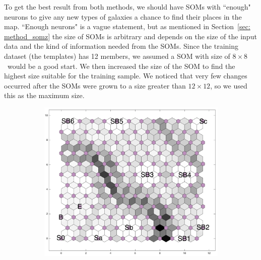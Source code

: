         To get the best result from both methods, we should have SOMs with ``enough"  neurons to give any new types of galaxies a chance to find their places in the map.
        ``Enough neurons" is a vague statement, but as mentioned in Section~\ref{sec: method_somz} the size of SOMs is arbitrary and depends on the size of the input data and the kind of information needed from the SOMs.
        Since the training dataset (the  templates) has 12 members, we assumed a SOM with size of $8\times8$~would be a good start.
        We then increased the size of the SOM to find the highest size suitable for the training sample.
        We noticed that very few changes occurred after the SOMs were grown to a size greater than $12\times12$, so we used this as the maximum size.
    
        \begin{figure}
            \begin{subfigure}[b]{0.45\textwidth}
                \centering
                \includegraphics[width=\textwidth]{images0.01/2d/dist_12_by_12.png}
            \end{subfigure}
            \hfill
            \begin{subfigure}[b]{0.45\textwidth}
                \centering

\end{subfigure}
\end{figure}

